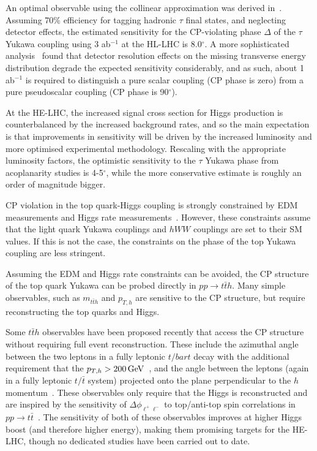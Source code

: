 An optimal observable using the collinear approximation was derived in~\cite{Harnik:2013aja}. Assuming 70\% efficiency for tagging hadronic $\tau$ final states, and
neglecting detector effects, the estimated sensitivity for the
CP-violating phase $\Delta$ of the $\tau$ Yukawa coupling using 3 ab$^{-1}$ at
the HL-LHC is 8.0$^\circ$.  A more sophisticated
analysis~\cite{Askew:2015mda} found that detector resolution effects
on the missing transverse energy distribution degrade the expected
sensitivity considerably, and as such, about 1 ab$^{-1}$ is required
to distinguish a pure scalar coupling (CP phase is zero) from a pure
pseudoscalar coupling (CP phase is 90$^\circ$).

At the HE-LHC, the increased signal cross section for Higgs production
is counterbalanced by the increased background rates, and so the main
expectation is that improvements in sensitivity will be driven by the
increased luminosity and more optimised experimental methodology.
Rescaling with the appropriate luminosity factors, the optimistic
sensitivity to the $\tau$ Yukawa phase from acoplanarity studies is
4-5$^\circ$, while the more conservative estimate is roughly an order
of magnitude bigger.


CP violation in the top quark-Higgs coupling is strongly constrained by EDM measurements and Higgs rate measurements~\cite{Brod:2013cka}. However, these constraints assume that the light quark Yukawa couplings and $hWW$ couplings are set to their SM values. If this is not the case, the constraints on the phase of the top Yukawa coupling are less stringent.
    
Assuming the EDM and Higgs rate  constraints can be avoided, the CP structure of the top quark Yukawa can be probed directly in $pp \to t\bar t h$. Many simple observables, such as $m_{t\bar t h}$ and $p_{T,h}$ are sensitive to the CP structure, but require reconstructing the top quarks and Higgs.

Some $t\bar t h$ observables have been proposed recently that access the CP structure without requiring full event reconstruction. These include the azimuthal angle between the two leptons in a fully leptonic $t/bar{t}$ decay with the additional requirement that the $p_{T,h} > 200\, \text{\ensuremath{\text{GeV}}}$~\cite{Buckley:2015vsa}, and the angle between the leptons (again in a fully leptonic $t/\bar t$ system) projected onto the plane perpendicular to the $h$ momentum~\cite{Boudjema:2015nda}. These observables only require that the Higgs is reconstructed and are inspired by the sensitivity of $\Delta \phi_{\ell^+\ell^-}$ to top/anti-top spin correlations in $pp \to t\bar t$~\cite{Mahlon:1995zn}. The sensitivity of both of these observables improves at higher Higgs boost (and therefore higher energy), making them promising targets for the HE-LHC, though no dedicated studies have been carried out to date.
